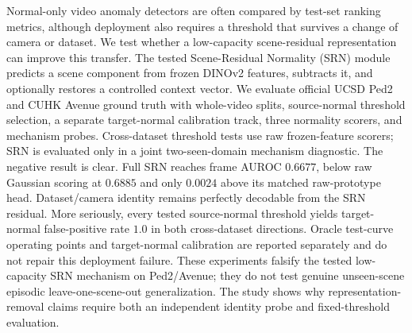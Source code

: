 Normal-only video anomaly detectors are often compared by test-set ranking metrics, although deployment also requires a threshold that survives a change of camera or dataset. We test whether a low-capacity scene-residual representation can improve this transfer. The tested Scene-Residual Normality (SRN) module predicts a scene component from frozen DINOv2 features, subtracts it, and optionally restores a controlled context vector. We evaluate official UCSD Ped2 and CUHK Avenue ground truth with whole-video splits, source-normal threshold selection, a separate target-normal calibration track, three normality scorers, and mechanism probes. Cross-dataset threshold tests use raw frozen-feature scorers; SRN is evaluated only in a joint two-seen-domain mechanism diagnostic. The negative result is clear. Full SRN reaches frame AUROC $0.6677$, below raw Gaussian scoring at $0.6885$ and only $0.0024$ above its matched raw-prototype head. Dataset/camera identity remains perfectly decodable from the SRN residual. More seriously, every tested source-normal threshold yields target-normal false-positive rate $1.0$ in both cross-dataset directions. Oracle test-curve operating points and target-normal calibration are reported separately and do not repair this deployment failure. These experiments falsify the tested low-capacity SRN mechanism on Ped2/Avenue; they do not test genuine unseen-scene episodic leave-one-scene-out generalization. The study shows why representation-removal claims require both an independent identity probe and fixed-threshold evaluation.
